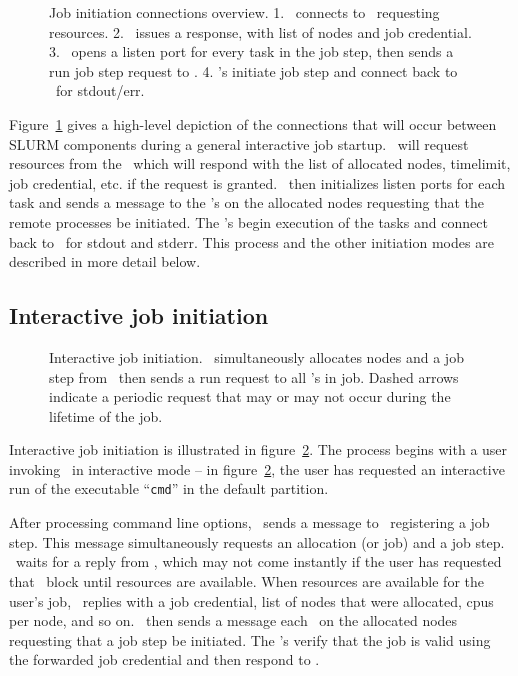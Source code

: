 \begin{figure}[tb]
\centerline{}
\caption{\small Job initiation connections overview. 1. \srun\ connects to 
         \slurmctld\ requesting resources. 2. \slurmctld\ issues a response,
	 with list of nodes and job credential. 3. \srun\ opens a listen
	 port for every task in the job step, then sends a run job step
	 request to \slurmd . 4. \slurmd 's initiate job step and connect
	 back to \srun\ for stdout/err. }
\label{connections}
\end{figure}

Figure~\ref{connections} gives a high-level depiction of the connections
that will occur between SLURM components during a general interactive job
startup. \srun\ will request resources from the \slurmctld\ which will 
respond with the list of allocated nodes, timelimit, job credential, etc.
if the request is granted. \srun\ then initializes listen ports for each
task and sends a message to the \slurmd 's on the allocated nodes requesting
that the remote processes be initiated. The \slurmd 's begin execution of
the tasks and connect back to \srun\ for stdout and stderr. This process and
the other initiation modes are described in more detail below.

\subsection{Interactive job initiation}

\begin{figure}[tb]
\centerline{ }
\caption{\small Interactive job initiation. \srun\ simultaneously allocates nodes
         and a job step from \slurmctld\ then sends a run request to all
	 \slurmd 's in job. Dashed arrows indicate a periodic request that
	 may or may not occur during the lifetime of the job.}
\label{init-interactive}
\end{figure}

Interactive job initiation is illustrated in figure~\ref{init-interactive}.
The process begins with a user invoking \srun\ in interactive mode -- in 
figure~\ref{init-interactive}, the user has requested an interactive
run of the executable ``{\tt cmd}'' in the default partition. 

After processing command line options, \srun\ sends a message to
\slurmctld\ registering a job step. This message simultaneously requests
an allocation (or job) and a job step. \srun\ waits for a reply from
\slurmctld , which may not come instantly if the user has requested that
\srun\ block until resources are available. When resources are available
for the user's job, \slurmctld\ replies with a job credential, list of
nodes that were allocated, cpus per node, and so on. \srun\ then sends
a message each \slurmd\ on the allocated nodes requesting that a job
step be initiated. The \slurmd 's verify that the job is valid using
the forwarded job credential and then respond to \srun .


